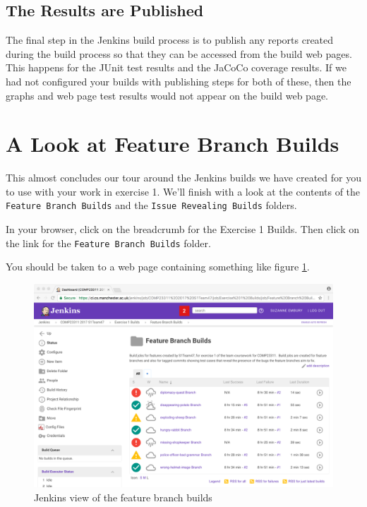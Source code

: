 \documentclass[
]{book}
\begin{document}
\hypertarget{results}{%
\subsection{The Results are Published}\label{results}}

The final step in the Jenkins build process is to publish any reports created during the build process so that they can be accessed from the build web pages. This happens for the JUnit test results and the JaCoCo coverage results. If we had not configured your builds with publishing steps for both of these, then the graphs and web page test results would not appear on the build web page.

\hypertarget{fbuilds}{%
\section{A Look at Feature Branch Builds}\label{fbuilds}}

This almost concludes our tour around the Jenkins builds we have created for you to use with your work in exercise 1. We'll finish with a look at the contents of the \texttt{Feature\ Branch\ Builds} and the \texttt{Issue\ Revealing\ Builds} folders.

In your browser, click on the breadcrumb for the Exercise 1 Builds. Then click on the link for the \texttt{Feature\ Branch\ Builds} folder.

You should be taken to a web page containing something like figure \ref{fig:FeatureBranchBuilds-fig}.

\begin{figure}

{\centering \includegraphics[width=1\linewidth]{images/FeatureBranchBuilds} 

}

\caption{Jenkins view of the feature branch builds}\label{fig:FeatureBranchBuilds-fig}
\end{figure}
\end{document}

